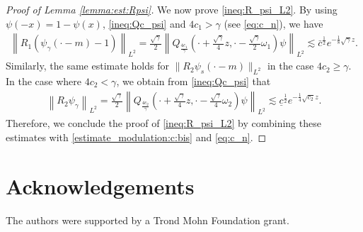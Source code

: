\documentclass[reqno,10pt]{amsart}
\numberwithin{equation}{section}
\begin{document}
\begin{proof}[Proof of Lemma \ref{lemma:est:Rpsi}]
   
			We now prove \eqref{ineq:R_psi_L2}. By using $\psi(-x)=1-\psi(x)$, \eqref{ineq:Qc_psi} and $4c_1>\gamma$ (see \eqref{eq:c_n}), we have 
            \begin{align*}
				\left\| R_1 \left( \psi_\gamma (\cdot-m)- 1 \right) \right\|_{L^2} = \frac{\sqrt{\gamma}}2 \left\| Q_{\frac{4c_1}{\gamma}} \left( \cdot + \frac{\sqrt{\gamma}}4 z, \cdot - \frac{\sqrt{\gamma}}2\omega_1  \right) \psi \right\|_{L^2} \lesssim \bar{c}^{\frac12} e^{ -\frac18 \sqrt{\gamma}z} .
			\end{align*}
           Similarly, the same estimate holds for $\|R_2\psi_s(\cdot-m)\|_{L^2}$ in the case $4c_2 \geq \gamma$. In the case where $4c_2<\gamma$, we obtain from \eqref{ineq:Qc_psi} that 
			\begin{align*}
				\left\| R_2 \psi_\gamma \right\|_{L^2} = \frac{\sqrt{\gamma}}2 \left\| Q_{\frac{4c_2}{\gamma}} \left( \cdot +\frac{\sqrt{\gamma}}4 z , \cdot -\frac{\sqrt{\gamma}}4 \omega_2 \right) \psi \right\|_{L^2} \lesssim \underline{c}^\frac12  e^{-\frac14 \sqrt{c_2}z}.
			\end{align*}
			Therefore, we conclude the proof of \eqref{ineq:R_psi_L2} by combining these estimates with \eqref{estimate_modulation:c:bis} and \eqref{eq:c_n}.
\end{proof}

\section*{Acknowledgements} 

The authors were supported by a Trond Mohn Foundation grant. 

	
	
	
	
	
	
\end{document}
